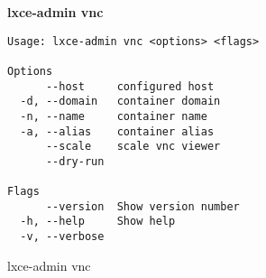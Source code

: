 \newpage
\textbf{lxce-admin vnc}
\begin{listing}[H]
\begin{verbatim}
Usage: lxce-admin vnc <options> <flags>

Options
      --host     configured host                             
  -d, --domain   container domain                            
  -n, --name     container name                              
  -a, --alias    container alias                             
      --scale    scale vnc viewer                            
      --dry-run                                              

Flags
      --version  Show version number                        
  -h, --help     Show help                                  
  -v, --verbose
\end{verbatim}
\caption{lxce-admin vnc}
\label{listings: lxce-admin vnc}
\end{listing}
